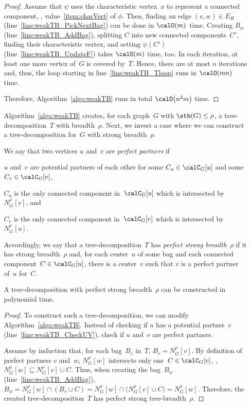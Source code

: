 \begin{proof}
Assume that $\psi$ uses the characteristic vertex~$x$ to represent a connected component, \ie, value~\ref{item:charVert} of $\phi$.
Then, finding an edge $(v, w) \in E_H$ (line~\ref{line:weakTB_PickNextBag}) can be done in $\calO(m)$~time.
Creating $B_w$ (line~\ref{line:weakTB_AddBag}), splitting $C$ into new connected components~$C'$, finding their characteristic vertex, and setting $\psi(C')$ (line~\ref{line:weakTB_UpdateF}) takes $\calO(m)$ time, too.
In each iteration, at least one more vertex of~$G$ is covered by~$T$.
Hence, there are at most $n$ iterations and, thus, the loop starting in line~\ref{line:weakTB_Tloop} runs in $\calO(mn)$ time.

Therefore, Algorithm~\ref{algo:weakTB} runs in total $\calO \big( n^2m \big)$ time.
\end{proof}

Algorithm~\ref{algo:weakTB} creates, for each graph~$G$ with $\stb(G) \leq \rho$, a tree-decomposition~$T$ with breadth~$\rho$.
Next, we invest a case where we can construct a tree-decomposition for~$G$ with strong breadth~$\rho$.

We say that two vertices $u$ and~$v$ are \emph{perfect partners} if
\begin{enumerate*}[(i),mode=unboxed]
    \item
        $u$ and~$v$ are potential partners of each other for some $C_u \in \calC_G[u]$ and some $C_v \in \calC_G[v]$,
    \item
        $C_u$ is the only connected component in~$\calC_G[u]$ which is intersected by~$N_G^\rho[v]$, and
    \item
        $C_v$ is the only connected component in~$\calC_G[v]$ which is intersected by~$N_G^\rho[u]$.
\end{enumerate*}
Accordingly, we say that a tree-decomposition~$T$ has \emph{perfect strong breadth~\( \rho \)} if it has strong breadth~$\rho$ and, for each center~$u$ of some bag and each connected component~$C \in \calC_G[u]$, there is a center~$v$ such that $v$ is a perfect partner of~$u$ for~$C$.

\begin{theorem}
A tree-decomposition with perfect strong breadth~\( \rho \) can be constructed in polynomial time.
\end{theorem}

\begin{proof}
To construct such a tree-decomposition, we can modify Algorithm~\ref{algo:weakTB}.
Instead of checking if $u$ has a potential partner~$v$ (line~\ref{line:weakTB_CheckUV}), check if $u$ and~$v$ are perfect partners.

Assume by induction that, for each bag~$B_v$ in~$T$, $B_v = N_G^\rho[v]$.
By definition of perfect partners $v$ and~$w$, $N_G^\rho[w]$ intersects only one~$C \in \calC_G[v]$, \ie, $N_G^\rho[w] \subseteq N_G^\rho[v] \cup C$.
Thus, when creating the bag~$B_w$ (line~\ref{line:weakTB_AddBag}), $B_w = N_G^\rho[w] \cap (B_v \cup C) = N_G^\rho[w] \cap \big( N_G^\rho[v] \cup C \big) = N_G^\rho[w]$.
Therefore, the created tree-decomposition~$T$ has perfect strong tree-breadth~$\rho$.
\end{proof}

